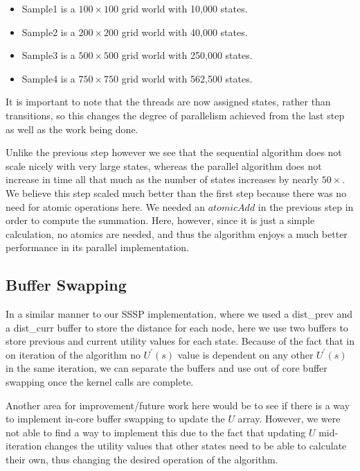 \documentclass[letterpaper,twocolumn,10pt]{article}
\begin{document}
{\begin{itemize}
	\item Sample1 is a $100\times100$ grid world with 10,000 states.
	\item Sample2 is a $200\times200$ grid world with 40,000 states.
	\item Sample3 is a $500\times500$ grid world with 250,000 states.
	\item Sample4 is a $750\times750$ grid world with 562,500 states.
\end{itemize}

It is important to note that the threads are now assigned states, rather than transitions, so this changes the degree of parallelism achieved from the last step as well as the work being done.

Unlike the previous step however we see that the sequential algorithm does not scale nicely with very large states, whereas the parallel algorithm does not increase in time all that much as the number of states increases by nearly $50\times$. We believe this step scaled much better than the first step because there was no need for atomic operations here. We needed an $atomicAdd$ in the previous step in order to compute the summation. Here, however, since it is just a simple calculation, no atomics are needed, and thus the algorithm enjoys a much better performance in its parallel implementation.

\subsection{Buffer Swapping}

In a similar manner to our SSSP implementation, where we used a dist\_prev and a dist\_curr buffer to store the distance for each node, here we use two buffers to store previous and current utility values for each state. Because of the fact that in on iteration of the algorithm no $U^\prime(s)$ value is dependent on any other $U^\prime(s)$ in the same iteration, we can separate the buffers and use out of core buffer swapping once the kernel calls are complete.

Another area for improvement/future work here would be to see if there is a way to implement in-core buffer swapping to update the $U$ array. However, we were not able to find a way to implement this due to the fact that updating $U$ mid-iteration changes the utility values that other states need to be able to calculate their own, thus changing the desired operation of the algorithm.

}
\end{document}
